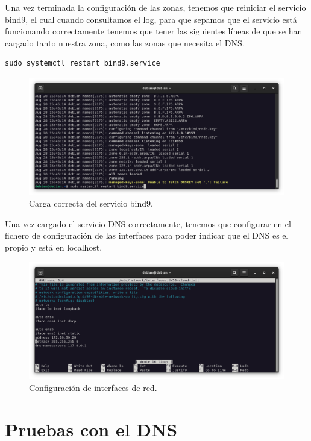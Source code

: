 Una vez terminada la configuración de las zonas, tenemos que reiniciar el servicio bind9, el cual cuando consultamos el log, para que sepamos que el servicio está funcionando correctamente tenemos que tener las siguientes líneas de que se han cargado tanto nuestra zona, como las zonas que necesita el DNS.

\begin{lstlisting}[style=mybash]
sudo systemctl restart bind9.service
\end{lstlisting}

\begin{figure}[H]
	\centering
	\includegraphics[scale=0.30]{07}
	\caption{Carga correcta del servicio bind9.}
\end{figure}

Una vez cargado el servicio DNS correctamente, tenemos que configurar en el fichero de configuración de las interfaces para poder indicar que el DNS es el propio y está en localhost.

\begin{figure}[H]
	\centering
	\includegraphics[scale=0.30]{08}
	\caption{Configuración de interfaces de red.}
\end{figure}

\newpage
\section{Pruebas con el DNS}

